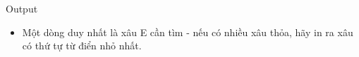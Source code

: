 Output
\begin{itemize}
	\item     Một dòng duy nhất là xâu E cần tìm - nếu có nhiều xâu thỏa, hãy in ra xâu có thứ tự từ điển nhỏ nhất.   
\end{itemize}